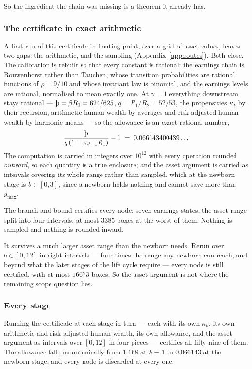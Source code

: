 So the ingredient the chain was missing is a theorem it already has.

\subsubsection*{The certificate in exact arithmetic}

A first run of this certificate in floating point, over a grid of asset values, leaves two gaps:
the arithmetic, and the sampling (Appendix~\ref{app:routes}). Both close. The calibration is rebuilt
so that every constant is rational: the
earnings chain is Rouwenhorst rather than Tauchen, whose transition probabilities are rational
functions of $\rho=9/10$ and whose invariant law is binomial, and the earnings levels are rational,
normalised to mean exactly one. At $\gamma=1$ everything downstream stays rational ---
$\Thorn=\beta R_1=624/625$, $q=R_1/R_2=52/53$, the propensities $\kappa_k$ by their recursion,
arithmetic human wealth by averages and risk-adjusted human wealth by harmonic means --- so the
allowance is an exact rational number,
\[
  \frac{\Thorn}{q\,(1-\kappa_{J-1}R_1)}-1\;=\;0.066143400439\ldots
\]
The computation is carried in integers over $10^{12}$ with every operation rounded \emph{outward}, so
each quantity is a true enclosure; and the asset argument is carried as intervals covering its whole
range rather than sampled, which at the newborn stage is $b\in[0,3]$, since a newborn holds nothing and
cannot save more than $y_{\max}$.

The branch and bound certifies every node: seven earnings states, the asset range split into four
intervals, at most $3385$ boxes at the worst of them. Nothing is sampled and nothing is rounded
inward.

It survives a much larger asset range than the newborn needs. Rerun over $b\in[0,12]$ in eight
intervals --- four times the range any newborn can reach, and beyond what the later stages of the life
cycle require --- every node is still certified, with at most $16673$ boxes. So the asset argument is
not where the remaining scope question lies.

\subsubsection*{Every stage}

Running the certificate at each stage in turn --- each with its own $\kappa_k$, its own arithmetic and
risk-adjusted human wealth, its own allowance, and the asset argument as intervals over $[0,12]$ in
four pieces --- certifies all fifty-nine of them. The allowance falls monotonically from $1.168$ at
$k=1$ to $0.066143$ at the newborn stage, and every node is discarded at every one.

